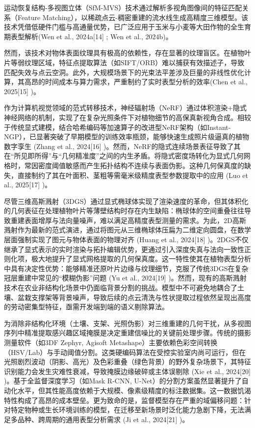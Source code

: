 \documentclass[preprint,12pt]{elsarticle}
\begin{document}
运动恢复结构-多视图立体（SfM-MVS）技术通过解析多视角图像间的特征匹配关系（Feature Matching），以稀疏点云-稠密重建的流水线生成高精度三维模型。该技术凭借低硬件门槛与高通量优势，已广泛应用于玉米与小麦等大田作物的全生育期表型解析(Wen et al., 2024a[14] ; Wen et al., 2024b)。

然而，该技术对物体表面纹理具有极高的依赖性，存在显著的纹理盲区。在植物叶片等弱纹理区域，特征点提取算法（如SIFT/ORB）难以捕获有效描述子，导致匹配失效与点云空洞。此外，大规模场景下的光束法平差涉及巨量的非线性优化计算，其高昂的时间成本与算力需求，严重制约了实时表型分析的效率(Chen et al., 2025[15] )。

作为计算机视觉领域的范式转移技术，神经辐射场（NeRF）通过体积渲染+隐式神经网络的机制，实现了在复杂光照条件下对植物细节的高保真新视角合成。相较于传统显式建模，结合哈希编码等加速算子的改进型NeRF架构（如Instant-NGP），已显著突破了早期模型的训练效率瓶颈，能够快速生成照片级逼真的植物数字孪生 (Zhang et al., 2024[16] )。然而，NeRF的隐式连续场景表征导致了其在“所见即所得”与“几何精准度”之间的内生矛盾。将隐式密度场转化为显式几何网格时，常因密度阈值敏感而产生拓扑结构不连续与表面伪影。这种几何保真度的缺失，直接制约了其在叶面积、茎粗等需毫米级精度表型参数提取中的应用 (Luo et al., 2025[17] )。

尽管三维高斯溅射（3DGS）通过显式椭球体实现了渲染速度的革命，但其体积化的几何表征在处理植物叶片等薄壁结构时存在内生缺陷：椭球体的空间重叠往往导致重建表面增厚与法向量噪声，难以满足高精度表型测量的需求。为此，2D高斯溅射作为最新的范式演进，通过将图元从三维椭球体压扁为二维定向圆盘，在数学层面强制实现了图元与物体表面的物理对齐 (Huang et al., 2024[18] )。2DGS不仅继承了显式表示的实时渲染与拓扑编辑优势，更通过引入深度失真与法向一致性正则化项，极大地提升了显式网格提取的几何保真度。这一特性使其在植物表型分析中具有决定性优势：能够精准还原叶片边缘与纹理细节，克服了传统3DGS在复杂冠层重建中常见的“模糊伪影”问题 (Yu et al., 2024[19] )。然而，现有的高斯溅射技术在农业非结构化场景中仍面临背景分割的挑战。模型中不可避免地耦合了土壤、盆栽支撑架等背景噪声，导致后续的点云清洗与性状提取过程依然呈现出高度的劳动密集型特征，亟需开发端到端的语义剔除算法。

为消除非结构化环境（土壤、支架、光照伪影）对三维重建的几何干扰，从多视图序列中精准提取感兴趣区域掩膜是决定重建信噪比的关键前处理步骤。传统的摄影测量软件（如3DF Zephyr, Agisoft Metashape）主要依赖色彩空间转换（HSV/Lab）与手动阈值分割。这类硬编码算法在受控实验室内尚可运行，但在光照剧烈波动（阴影、高光）及色彩重叠（绿色背景）的野外复杂场景下，其特征识别能力会发生灾难性衰减，导致掩膜边缘破碎或主体误剔除 (Xie et al., 2024[20] )。基于全监督深度学习（如Mask R-CNN, U-Net）的分割方案虽然显著提升了自动化水平，但其性能高度依赖于大规模、像素级精度的标注数据集。这一数据饥渴特性构成了高昂的成本壁垒。更为致命的是，监督模型存在严重的域偏移问题：针对特定物种或生长环境训练的模型，在迁移至新场景时泛化能力急剧下降，无法满足多品种、跨周期的通用表型分析需求 (Ji et al., 2024[21] )。
\end{document}
